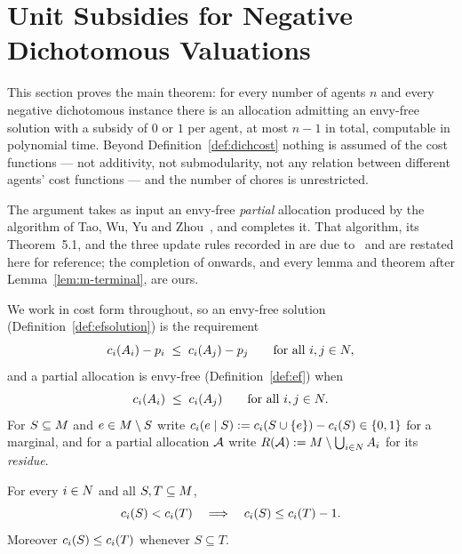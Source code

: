 \section{Unit Subsidies for Negative Dichotomous Valuations}
\label{sec:main}

This section proves the main theorem: for every number of agents $n$ and every
negative dichotomous instance there is an allocation admitting an envy-free
solution with a subsidy of $0$ or $1$ per agent, at most $n-1$ in total,
computable in polynomial time. Beyond Definition~\ref{def:dichcost} nothing is
assumed of the cost functions --- not additivity, not submodularity, not any
relation between different agents' cost functions --- and the number of chores
is unrestricted.

The argument takes as input an envy-free \emph{partial} allocation produced by
the algorithm of Tao, Wu, Yu and Zhou~\cite{TWYZ23}, and completes it. That
algorithm, its Theorem~5.1, and the three update rules recorded in
 are due to~\cite{TWYZ23} and are restated here for
reference; the completion of  onwards, and every lemma
and theorem after Lemma~\ref{lem:m-terminal}, are ours.

We work in cost form throughout, so an envy-free solution
(Definition~\ref{def:efsolution}) is the requirement
\begin{equation}
\label{eq:m-ef}
  c_i(A_{i}) - p_i \;\le\; c_i(A_{j}) - p_j
  \qquad \text{for all } i,j \in N ,
\end{equation}
and a partial allocation is envy-free (Definition~\ref{def:ef}) when
\begin{equation}
\label{eq:m-pef}
  c_i(A_{i}) \;\le\; c_i(A_{j})
  \qquad \text{for all } i,j \in N .
\end{equation}
For $S \subseteq M$ and $e \in M \setminus S$ write
$c_i(e \mid S) := c_i(S \cup \left\{e\right\}) - c_i(S) \in \left\{0,1\right\}$ for a
marginal, and for a partial allocation $\mathcal{A}$ write
$R(\mathcal{A}) := M \setminus \bigcup_{i \in N} A_{i}$ for its
\emph{residue}.

\begin{observation}
\label{obs:m-gap}
For every $i \in N$ and all $S,T \subseteq M$,
\[
  c_i(S) < c_i(T) \quad\Longrightarrow\quad c_i(S) \le c_i(T) - 1 .
\]
Moreover $c_i(S) \le c_i(T)$ whenever $S \subseteq T$.
\end{observation}

